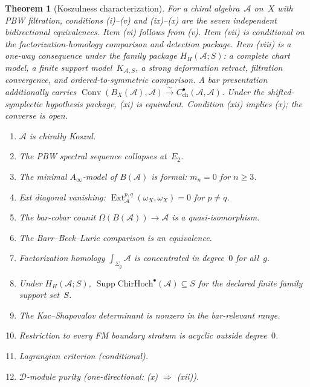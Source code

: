 \documentclass[11pt,reqno]{amsart}
\newtheorem{theorem}{Theorem}[section]
\theoremstyle{definition}
\theoremstyle{remark}
\newcommand{\cA}{\mathcal{A}}
\newcommand{\cD}{\mathcal{D}}
\numberwithin{equation}{section}
\begin{document}
\begin{theorem}[Koszulness characterization]
\label{thm:koszul-meta}
For a chiral algebra~$\cA$ on~$X$ with PBW filtration,
conditions \textup{(i)--(v)} and \textup{(ix)--(x)} are the
seven independent bidirectional equivalences. Item
\textup{(vi)} follows from \textup{(v)}. Item \textup{(vii)}
is conditional on the factorization-homology comparison and
detection package. Item \textup{(viii)} is a one-way consequence
under the family package $H_H(\cA;S)$: a complete chart model, a
finite support model~$K_{\cA,S}$, a strong deformation retract,
filtration convergence, and ordered-to-symmetric comparison.  A bar
presentation additionally carries
$\operatorname{Conv}(B_X(\cA),\cA)\xrightarrow{\sim}
C^\bullet_{\mathrm{ch}}(\cA,\cA)$.
Under the shifted-symplectic hypothesis package, \textup{(xi)} is
equivalent. Condition \textup{(xii)} implies \textup{(x)}; the
converse is open.
\begin{enumerate}[label=\textup{(\roman*)}]
\item $\cA$ is chirally Koszul.
\item The PBW spectral sequence collapses at\/~$E_2$.
\item The minimal $A_\infty$-model of $B(\cA)$
 is formal: $m_n = 0$ for $n \ge 3$.
\item Ext diagonal vanishing:
 $\operatorname{Ext}^{p,q}_\cA(\omega_X, \omega_X) = 0$
 for $p \ne q$.
\item The bar-cobar counit
 $\Omega(B(\cA)) \to \cA$ is a quasi-isomorphism.
\item The Barr--Beck--Lurie comparison is an equivalence.
\item Factorization homology
 $\int_{\Sigma_g}\!\cA$ is concentrated in degree~$0$
 for all~$g$.
\item Under $H_H(\cA;S)$,
 $\operatorname{Supp}\mathrm{ChirHoch}^\bullet(\cA)\subseteq S$
 for the declared finite family support set~$S$.
\item The Kac--Shapovalov determinant is nonzero in the
 bar-relevant range.
\item Restriction to every FM boundary stratum is
 acyclic outside degree~$0$.
\item[{\upshape (xi)}] Lagrangian criterion \textup{(conditional)}.
\item[{\upshape (xii)}] $\cD$-module purity
 \textup{(one-directional: (x) $\Rightarrow$ (xii))}.
\end{enumerate}
\end{theorem}
\end{document}
